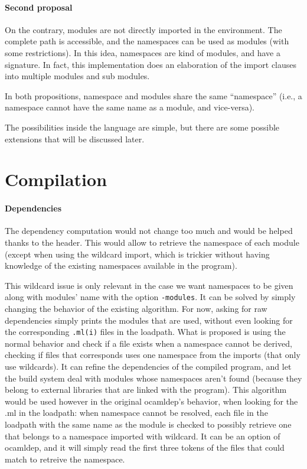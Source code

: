 \documentclass[11pt,a4paper]{article}
\begin{document}
\paragraph{Second proposal}

On the contrary, modules are not directly imported in the environment. The
complete path is accessible, and the namespaces can be used as modules (with
some restrictions). In this idea, namespaces are kind of modules, and have a
signature. In fact, this implementation does an elaboration of the import
clauses into multiple modules and sub modules.

In both propositions, namespace and modules share the same ``namespace'' (i.e.,
a namespace cannot have the same name as a module, and vice-versa).

The possibilities inside the language are simple, but there are some possible
extensions that will be discussed later.

\section{Compilation}

\paragraph{Dependencies}

The dependency computation would not change too much and would be helped thanks
to the header. This would allow to retrieve the namespace of each module (except
when using the wildcard import, which is trickier without having knowledge of
the existing namespaces available in the program).

This wildcard issue is only relevant in the case we want namespaces to be given
along with modules' name with the option \texttt{-modules}. It can be solved by
simply changing the behavior of the existing algorithm. For now, asking for raw
dependencies simply prints the modules that are used, without even looking for
the corresponding \texttt{.ml(i)} files in the loadpath. What is proposed is
using the normal behavior and check if a file exists when a namespace cannot be
derived, checking if files that corresponds uses one namespace from the imports
(that only use wildcards). It can refine the dependencies of the compiled
program, and let the build system deal with modules whose namespaces aren't
found (because they belong to external libraries that are linked with the
program). This algorithm would be used however in the original ocamldep's
behavior, when looking for the .ml in the loadpath: when namespace cannot be
resolved, each file in the loadpath with the same name as the module is checked
to possibly retrieve one that belongs to a namespace imported with wildcard. It
can be an option of ocamldep, and it will simply read the first three tokens of
the files that could match to retreive the namespace.
\end{document}
